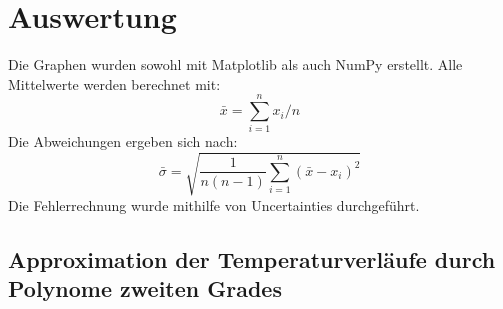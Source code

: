 \section{Auswertung}
\label{sec:Auswertung}

Die Graphen wurden sowohl mit Matplotlib \cite{matplotlib} als auch NumPy \cite{numpy} erstellt. 
Alle Mittelwerte werden berechnet mit:
\begin{equation}
\bar{x} = \sum_{i=1}^{n}x_i/n \label{eq:quer}
\end{equation}
Die Abweichungen ergeben sich nach:
\begin{equation}
\bar{\sigma} = \sqrt{\frac{1}{n(n-1)}\sum_{i=1}^{n}(\bar{x}-x_i)^2}  \label{eq:sigma}
\end{equation}
Die Fehlerrechnung wurde mithilfe von Uncertainties \cite{uncertainties} durchgeführt.

\subsection{Approximation der Temperaturverläufe durch Polynome zweiten Grades}

